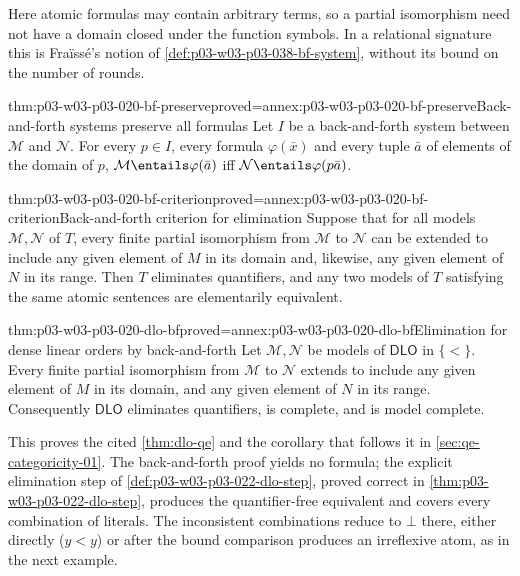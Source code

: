 Here atomic formulas may contain arbitrary terms, so a partial isomorphism
need not have a domain closed under the function symbols. In a relational
signature this is Fra\"iss\'e's notion of
\cref{def:p03-w03-p03-038-bf-system}, without its bound on the number of
rounds.

\begin{hbtheorem}{thm:p03-w03-p03-020-bf-preserve}{proved=annex:p03-w03-p03-020-bf-preserve}{Back-and-forth systems preserve all formulas}
Let \(I\) be a back-and-forth system between \(\mathcal M\) and
\(\mathcal N\). For every \(p\in I\), every formula \(\varphi(\bar x)\) and
every tuple \(\bar a\) of elements of the domain of \(p\),
\(\mathcal M\entails\varphi(\bar a)\) iff
\(\mathcal N\entails\varphi(p\bar a)\).
\end{hbtheorem}

\begin{hbcorollary}{thm:p03-w03-p03-020-bf-criterion}{proved=annex:p03-w03-p03-020-bf-criterion}{Back-and-forth criterion for elimination}
Suppose that for all models \(\mathcal M,\mathcal N\) of \(T\), every
finite partial isomorphism from \(\mathcal M\) to \(\mathcal N\) can be
extended to include any given element of \(M\) in its domain and, likewise,
any given element of \(N\) in its range. Then \(T\) eliminates
quantifiers, and any two models of \(T\) satisfying the same atomic
sentences are elementarily equivalent.
\end{hbcorollary}

\begin{hbtheorem}{thm:p03-w03-p03-020-dlo-bf}{proved=annex:p03-w03-p03-020-dlo-bf}{Elimination for dense linear orders by back-and-forth}
Let \(\mathcal M,\mathcal N\) be models of \(\mathsf{DLO}\) in \(\{<\}\).
Every finite partial isomorphism from \(\mathcal M\) to \(\mathcal N\)
extends to include any given element of \(M\) in its domain, and any given
element of \(N\) in its range. Consequently \(\mathsf{DLO}\) eliminates
quantifiers, is complete, and is model complete.
\end{hbtheorem}

This proves the cited \cref{thm:dlo-qe} and the corollary that follows it in
\cref{sec:qe-categoricity-01}. The back-and-forth proof yields no formula;
the explicit elimination step of \cref{def:p03-w03-p03-022-dlo-step},
proved correct in \cref{thm:p03-w03-p03-022-dlo-step}, produces the
quantifier-free equivalent and covers every combination of literals. The
inconsistent combinations reduce to \(\bot\) there, either directly
(\(y<y\)) or after the bound comparison produces an irreflexive atom, as in
the next example.

